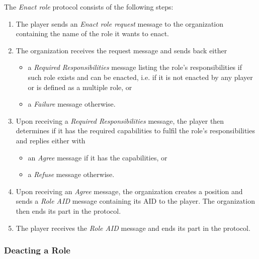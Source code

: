The \textit{Enact role} protocol consists of the following steps:
\begin{enumerate}
	\item The player sends an \textit{Enact role request} message to the organization containing the name of the role it wants to enact.
	\item The organization receives the request message and sends back either
	\begin{itemize}
		\item a \textit{Required Responsibilities} message listing the role's responsibilities if such role exists and can be enacted, i.e. if it is not enacted by any player or is defined as a multiple role, or
		\item a \textit{Failure} message otherwise. 
	\end{itemize}
	\item Upon receiving a \textit{Required Responsibilities} message, the player then determines if it has the required capabilities to fulfil the role's responsibilities and replies either with
	\begin{itemize}
		\item an \textit{Agree} message if it has the capabilities, or
		\item a \textit{Refuse} message otherwise.
	\end{itemize}
	\item Upon receiving an \textit{Agree} message, the organization creates a position and sends a \textit{Role AID} message containing its AID to the player.
	The organization then ends its part in the protocol.
	\item The player receives the \textit{Role AID} message and ends its part in the protocol.
\end{enumerate}


\subsubsection{Deacting a Role}


